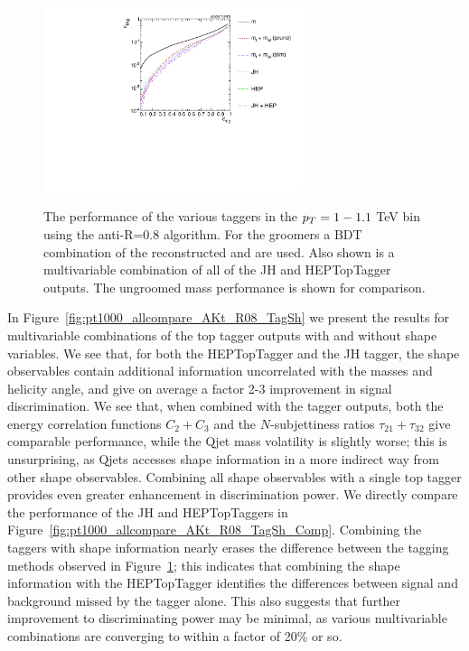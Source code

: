 \begin{figure}
\begin{center}
{\includegraphics[width=0.68\textwidth]{./Figures/TTagging/multi_variable/pT.1TeV.R.0.8/Rocs_tagger_groom.pdf}}
\caption{The performance of the various taggers in the $p_T = 1-1.1$ TeV bin using the anti-\kT R=0.8 algorithm. For the groomers a BDT combination of the reconstructed \topmass and \wmass are used. Also shown is a multivariable combination of all of the JH and HEPTopTagger outputs. The ungroomed mass performance is shown for comparison.}
\label{fig:pt1000_allcompare_AKt_R08_TG}
\end{center}
\end{figure}


In Figure~\ref{fig:pt1000_allcompare_AKt_R08_TagSh} we present the results for multivariable combinations of the top tagger outputs with and without shape variables. We see that, for both the HEPTopTagger and the JH tagger, the shape observables contain additional information uncorrelated with the masses and helicity angle, and give on average a factor 2-3 improvement in signal discrimination. We see that, when combined with the tagger outputs, both the energy correlation functions $C_2+C_3$ and the $N$-subjettiness ratios $\tau_{21}+\tau_{32}$ give comparable performance, while the Qjet mass volatility is slightly worse; this is unsurprising, as Qjets accesses shape information in a more indirect way from other shape observables. Combining all shape observables with a single top tagger provides even greater enhancement in discrimination power. We directly compare the performance of the JH and HEPTopTaggers in Figure~\ref{fig:pt1000_allcompare_AKt_R08_TagSh_Comp}. Combining the taggers with shape information nearly erases the difference between the tagging methods observed in Figure~\ref{fig:pt1000_allcompare_AKt_R08_TG}; this indicates that combining the shape information with the HEPTopTagger identifies the differences between signal and background missed by the tagger alone. This also suggests that further improvement to discriminating power may be minimal, as various multivariable combinations are converging to within a factor of 20\% or so.


